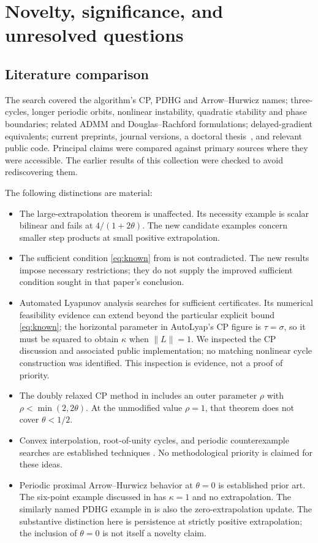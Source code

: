 \documentclass[11pt]{article}
\theoremstyle{remark}\newtheorem{remark}[theorem]{Remark}
\newcommand{\norm}[1]{\lVert #1\rVert}
\begin{document}
\section{Novelty, significance, and unresolved questions}\label{sec:novelty}

\subsection{Literature comparison}

The search covered the algorithm's CP, PDHG and Arrow--Hurwicz names; three-cycles, longer periodic orbits, nonlinear instability, quadratic stability and phase boundaries; related ADMM and Douglas--Rachford formulations; delayed-gradient equivalents; current preprints, journal versions, a doctoral thesis~\cite{Thesis}, and relevant public code. Principal claims were compared against primary sources where they were accessible. The earlier results of this collection were checked to avoid rediscovering them.

The following distinctions are material:
\begin{itemize}
\item The large-extrapolation theorem \cite{BUG} is unaffected. Its necessity example is scalar bilinear and fails at $4/(1+2\theta)$. The new candidate examples concern smaller step products at small positive extrapolation.
\item The sufficient condition \eqref{eq:known} from \cite{U26} is not contradicted. The new results impose necessary restrictions; they do not supply the improved sufficient condition sought in that paper's conclusion.
\item Automated Lyapunov analysis \cite{AutoTight,AutoLyap} searches for sufficient certificates. Its numerical feasibility evidence can extend beyond the particular explicit bound \eqref{eq:known}; the horizontal parameter in AutoLyap's CP figure is $\tau=\sigma$, so it must be squared to obtain $\kappa$ when $\norm L=1$. We inspected the CP discussion and associated public implementation; no matching nonlinear cycle construction was identified. This inspection is evidence, not a proof of priority.
\item The doubly relaxed CP method in \cite{NAG} includes an outer parameter $\rho$ with $\rho<\min(2,2\theta)$. At the unmodified value $\rho=1$, that theorem does not cover $\theta<1/2$.
\item Convex interpolation, root-of-unity cycles, and periodic counterexample searches are established techniques \cite{Cycles,SeilerCarrasco}. No methodological priority is claimed for these ideas.
\item Periodic proximal Arrow--Hurwicz behavior at $\theta=0$ is established prior art. The six-point example discussed in \cite[Section 3.2]{LiShi} has $\kappa=1$ and no extrapolation. The similarly named PDHG example in \cite[Section 6.1]{WangLuo} is also the zero-extrapolation update. The substantive distinction here is persistence at strictly positive extrapolation; the inclusion of $\theta=0$ is not itself a novelty claim.
\end{itemize}
\end{document}
